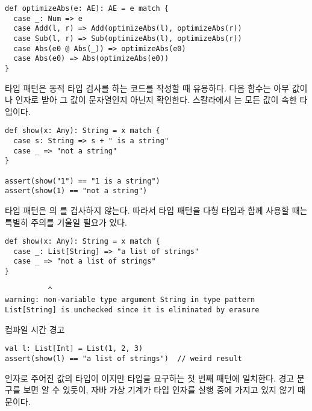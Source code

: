 \begin{verbatim}
def optimizeAbs(e: AE): AE = e match {
  case _: Num => e
  case Add(l, r) => Add(optimizeAbs(l), optimizeAbs(r))
  case Sub(l, r) => Sub(optimizeAbs(l), optimizeAbs(r))
  case Abs(e0 @ Abs(_)) => optimizeAbs(e0)
  case Abs(e0) => Abs(optimizeAbs(e0))
}
\end{verbatim}

타입 패턴은 동적 타입 검사를 하는 코드를 작성할 때 유용하다. 다음 함수는 아무
값이나 인자로 받아 그 값이 문자열인지 아닌지 확인한다. 스칼라에서 는
모든 값이 속한 타입이다.

\begin{verbatim}
def show(x: Any): String = x match {
  case s: String => s + " is a string"
  case _ => "not a string"
}

assert(show("1") == "1 is a string")
assert(show(1) == "not a string")
\end{verbatim}

타입 패턴은 의 를 검사하지 않는다. 따라서 타입 패턴을 다형 타입과 함께 사용할 때는
특별히 주의를 기울일 필요가 있다.

\begin{verbatim}
def show(x: Any): String = x match {
  case _: List[String] => "a list of strings"
  case _ => "not a list of strings"
}
\end{verbatim}
\vspace{-1em}
\begin{mdframed}[hidealllines=true,backgroundcolor=gray!10,innerleftmargin=3pt,innerrightmargin=3pt,leftmargin=-3pt,rightmargin=-3pt]
\begin{verbatim}
          ^
warning: non-variable type argument String in type pattern
List[String] is unchecked since it is eliminated by erasure
\end{verbatim}
\vspace{-1.5em}
\begin{flushright}
\scriptsize\textsf{컴파일 시간 경고}
\end{flushright}
\end{mdframed}

\begin{verbatim}
val l: List[Int] = List(1, 2, 3)
assert(show(l) == "a list of strings")  // weird result
\end{verbatim}

인자로 주어진 값의 타입이 이지만  타입을
요구하는 첫 번째 패턴에 일치한다. 경고 문구를 보면 알 수 있듯이, 자바 가상
기계가 타입 인자를 실행 중에 가지고 있지 않기 때문이다.

